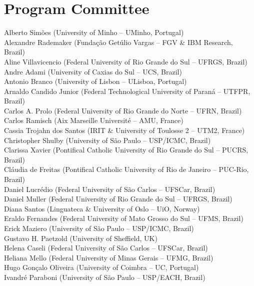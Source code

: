\documentclass[english, titlepage, a4paper]{lni}
\begin{document}
\section*{Program Committee}
Alberto Simões (University of Minho – UMinho, Portugal)\\
Alexandre Rademaker (Fundaç\~{a}o Get\'{u}lio Vargas – FGV \& IBM Research, Brazil)\\
Aline Villavicencio (Federal University of Rio Grande do Sul – UFRGS, Brazil)\\
Andre Adami (University of Caxias do Sul – UCS, Brazil)\\
Antonio Branco (University of Lisbon – ULisboa, Portugal)\\
Arnaldo Candido Junior (Federal Technological University of Paran\'{a} – UTFPR, Brazil)\\
Carlos A. Prolo (Federal University of Rio Grande do Norte – UFRN, Brazil)\\
Carlos Ramisch (Aix Marseille Universit\'{e} – AMU, France)\\
Cassia Trojahn dos Santos (IRIT \& University of Toulosse 2 – UTM2, France)\\
Christopher Shulby (University of S\~{a}o Paulo – USP/ICMC, Brazil)\\
Clarissa Xavier (Pontifical Catholic University of Rio Grande do Sul – PUCRS, Brazil)\\
Cl\'{a}udia de Freitas (Pontifical Catholic University of Rio de Janeiro – PUC-Rio, Brazil)\\
Daniel Lucr\'{e}dio (Federal University of S\~{a}o Carlos – UFSCar, Brazil)\\
Daniel Muller (Federal University of Rio Grande do Sul – UFRGS, Brazil)\\
Diana Santos (Linguateca \& University of Oslo – UiO, Norway)\\
Eraldo Fernandes (Federal University of Mato Grosso do Sul – UFMS, Brazil)\\
Erick Maziero (University of S\~{a}o Paulo – USP/ICMC, Brazil)\\
Gustavo H. Paetzold (University of Sheffield, UK)\\
Helena Caseli (Federal University of S\~{a}o Carlos – UFSCar, Brazil)\\
Heliana Mello (Federal University of Minas Gerais – UFMG, Brazil)\\
Hugo Gonçalo Oliveira (University of Coimbra – UC, Portugal)\\
Ivandr\'{e} Paraboni (University of S\~{a}o Paulo – USP/EACH, Brazil)\\
\end{document}
